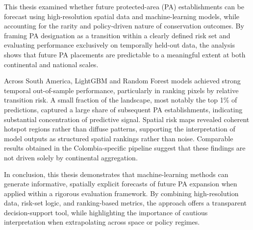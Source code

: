 \documentclass[12pt]{article}
\theoremstyle{break} %
\begin{document}
This thesis examined whether future protected-area (PA) establishments can be forecast using high-resolution spatial data and machine-learning models, while accounting for the rarity and policy-driven nature of conservation outcomes. By framing PA designation as a transition within a clearly defined risk set and evaluating performance exclusively on temporally held-out data, the analysis shows that future PA placements are predictable to a meaningful extent at both continental and national scales.

Across South America, LightGBM and Random Forest models achieved strong temporal out-of-sample performance, particularly in ranking pixels by relative transition risk. A small fraction of the landscape, most notably the top 1\% of predictions, captured a large share of subsequent PA establishments, indicating substantial concentration of predictive signal. Spatial risk maps revealed coherent hotspot regions rather than diffuse patterns, supporting the interpretation of model outputs as structured spatial rankings rather than noise. Comparable results obtained in the Colombia-specific pipeline suggest that these findings are not driven solely by continental aggregation.

In conclusion, this thesis demonstrates that machine-learning methods can generate informative, spatially explicit forecasts of future PA expansion when applied within a rigorous evaluation framework. By combining high-resolution data, risk-set logic, and ranking-based metrics, the approach offers a transparent decision-support tool, while highlighting the importance of cautious interpretation when extrapolating across space or policy regimes.
\end{document}
